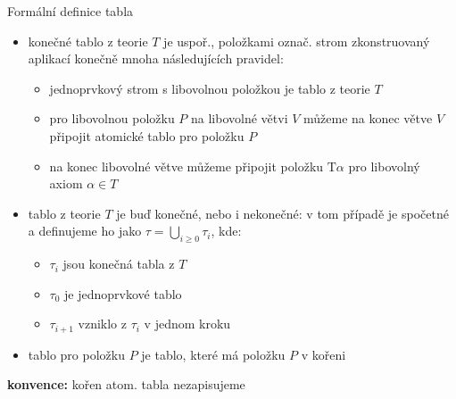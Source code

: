 \documentclass{beamer}
\begin{document}
\begin{frame}{Formální definice tabla}
    
    \begin{itemize}
        \item \alert{konečné tablo z teorie $T$} je uspoř., položkami označ. strom zkonstruovaný aplikací konečně mnoha následujících pravidel:
        \begin{itemize}
            \item jednoprvkový strom s libovolnou položkou je tablo z teorie $T$
            \item pro libovolnou položku $P$ na libovolné větvi $V$ můžeme na konec větve $V$ připojit atomické tablo pro položku $P$
            
            \medskip
            

            \medskip
            
            \item na konec libovolné větve můžeme připojit položku $\mathrm{T}\alpha$ pro libovolný axiom $\alpha\in T$
        \end{itemize}
        \item \alert{tablo z teorie $T$} je buď konečné, nebo i nekonečné: v tom případě je spočetné a definujeme ho jako $\tau=\bigcup_{i\geq 0}\tau_i$, kde:
        \begin{itemize}
            \item $\tau_i$ jsou konečná tabla z $T$
            \item $\tau_0$ je jednoprvkové tablo
            \item $\tau_{i+1}$ vzniklo z $\tau_i$ v jednom kroku
        \end{itemize}
        \item \alert{tablo pro položku $P$} je tablo, které má položku $P$ v kořeni
    \end{itemize}
   
    \textbf{konvence:} kořen atom. tabla nezapisujeme  

\end{frame}
\end{document}
